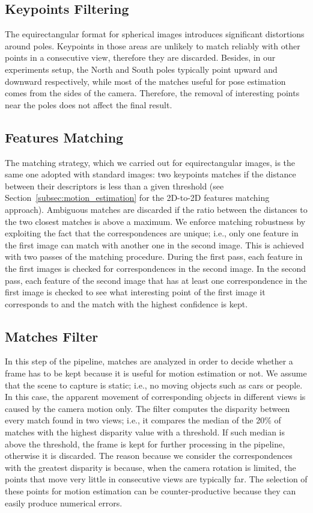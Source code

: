 \subsection{Keypoints Filtering}
The equirectangular format for spherical images introduces significant 
distortions around poles. Keypoints in those areas 
are unlikely to match reliably with other points in a consecutive view, therefore they are discarded.
Besides, in our experiments setup, the North and South poles typically point 
upward and downward respectively, while most of the matches useful for pose 
estimation comes from the sides of the camera. Therefore, the removal of interesting 
points near the poles does not affect the final result.

\subsection{Features Matching}\label{subsec:feature_matching}
The matching strategy, which we carried out for equirectangular images, is the same one 
adopted with standard images: two keypoints matches if the distance between 
their descriptors is less than a given threshold
(see Section~\ref{subsec:motion_estimation} for the 2D-to-2D features matching
approach). Ambiguous matches 
are discarded if the ratio between the distances to the two closest matches is 
above a maximum.
We enforce matching robustness by exploiting the fact that the correspondences are unique; i.e., only one feature in the first image can match with another one in the second image. This is achieved with two passes of the matching procedure. During the 
first pass, each feature in the first images is checked for correspondences in
the second image. In the second pass, each feature of the second image that 
has at least one correspondence in the first image is checked to see what 
interesting point of the first image it corresponds to and the match with the
highest confidence is kept.

\subsection{Matches Filter}
In this step of the pipeline, matches are analyzed in order to decide 
whether a frame has to be kept because it is useful for motion estimation or
not.
%
We assume that the scene to capture is static; i.e., no moving objects such as cars or people. In this case, the apparent movement of corresponding objects in different views is caused by the camera motion only.
%
The filter computes the disparity between every match found in two views; i.e., 
it compares the median of the 20\% of matches with the highest 
disparity value with a threshold. If such median is above 
the threshold, the frame is kept for further processing in the pipeline, 
otherwise it is discarded.
%
The reason because we consider the correspondences with the greatest disparity is 
because, when the camera rotation is limited, the points that move very little 
in consecutive views are typically far. The selection of these points for motion 
estimation can be counter-productive because they can easily produce numerical 
errors. 

